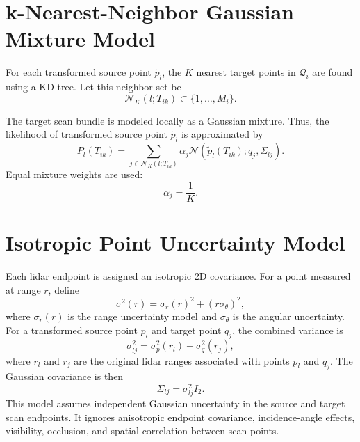 \documentclass[11pt]{article}
\begin{document}
\section{k-Nearest-Neighbor Gaussian Mixture Model}

For each transformed source point $\tilde p_l$, the $K$ nearest target points in $\mathcal{Q}_i$ are found using a KD-tree. Let this neighbor set be
\begin{equation}
\mathcal{N}_K(l;T_{ik}) \subset \{1,\dots,M_i\}.
\end{equation}

The target scan bundle is modeled locally as a Gaussian mixture. Thus, the likelihood of transformed source point $\tilde p_l$ is approximated by
\begin{equation}
P_l(T_{ik}) =
\sum_{j \in \mathcal{N}_K(l;T_{ik})}
\alpha_j
\mathcal{N}\left(\tilde p_l(T_{ik}); q_j, \Sigma_{lj}\right).
\end{equation}
Equal mixture weights are used:
\begin{equation}
\alpha_j = \frac{1}{K}.
\end{equation}

\section{Isotropic Point Uncertainty Model}

Each lidar endpoint is assigned an isotropic 2D covariance. For a point measured at range $r$, define
\begin{equation}
\sigma^2(r) = \sigma_r(r)^2 + \left(r\sigma_\theta\right)^2,
\end{equation}
where $\sigma_r(r)$ is the range uncertainty model and $\sigma_\theta$ is the angular uncertainty. For a transformed source point $p_l$ and target point $q_j$, the combined variance is
\begin{equation}
\sigma_{lj}^2 = \sigma_p^2(r_l) + \sigma_q^2(r_j),
\end{equation}
where $r_l$ and $r_j$ are the original lidar ranges associated with points $p_l$ and $q_j$. The Gaussian covariance is then
\begin{equation}
\Sigma_{lj} = \sigma_{lj}^2 I_2.
\end{equation}
This model assumes independent Gaussian uncertainty in the source and target scan endpoints. It ignores anisotropic endpoint covariance, incidence-angle effects, visibility, occlusion, and spatial correlation between scan points.
\end{document}

